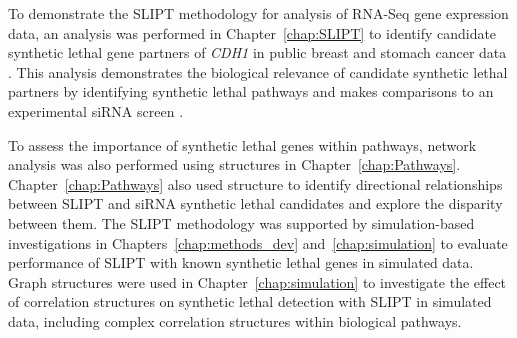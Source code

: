 To demonstrate the \gls{SLIPT} methodology for analysis of \gls{RNA-Seq} \gls{gene expression} data, an analysis was performed in Chapter~\ref{chap:SLIPT} to identify candidate \gls{synthetic lethal} gene partners of \textit{CDH1} in public breast and stomach cancer data \citep{TCGA2012, TCGA2014GC}. This analysis demonstrates the biological relevance of candidate \gls{synthetic lethal} partners by identifying \gls{synthetic lethal} pathways and makes comparisons to an experimental \gls{siRNA} screen \citep{Telford2015}.

To assess the importance of \gls{synthetic lethal} genes within \glspl{pathway}, network analysis was also performed using  structures in Chapter~\ref{chap:Pathways}. Chapter~\ref{chap:Pathways} also used  structure to identify directional relationships between \gls{SLIPT} and \gls{siRNA} \gls{synthetic lethal} candidates and explore the disparity between them. The \gls{SLIPT} methodology was supported by simulation-based investigations in Chapters~\ref{chap:methods_dev} and~\ref{chap:simulation} to evaluate performance of \gls{SLIPT} with known \gls{synthetic lethal} genes in simulated data. Graph structures were used in Chapter~\ref{chap:simulation} to investigate the effect of  correlation structures on \gls{synthetic lethal} detection with \gls{SLIPT} in simulated data, including complex correlation structures within biological pathways.

